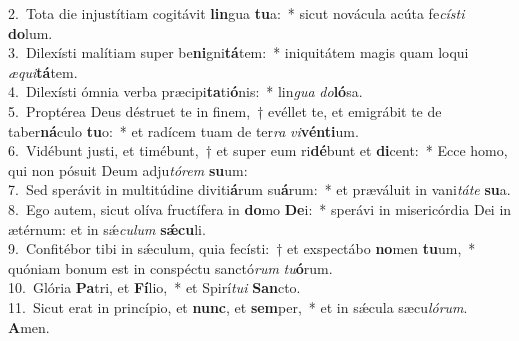 {2.~}Tota die injustítiam cogitávit \textbf{lin}gua \textbf{tu}a:~* sicut novácula acúta fe\textit{cí}\textit{sti} \textbf{do}lum.\\
{3.~}Dilexísti malítiam super be\textbf{ni}gni\textbf{tá}tem:~* iniquitátem magis quam loqui \textit{æ}\textit{qui}\textbf{tá}tem.\\
{4.~}Dilexísti ómnia verba præcipi\textbf{ta}ti\textbf{ó}nis:~* lin\textit{gua} \textit{do}\textbf{ló}sa.\\
{5.~}Proptérea Deus déstruet te in finem,~† evéllet te, et emigrábit te de taber\textbf{ná}culo \textbf{tu}o:~* et radícem tuam de ter\textit{ra} \textit{vi}\textbf{vén}\textbf{ti}um.\\
{6.~}Vidébunt justi, et timébunt,~† et super eum ri\textbf{dé}bunt et \textbf{di}cent:~* Ecce homo, qui non pósuit Deum adju\textit{tó}\textit{rem} \textbf{su}um:\\
{7.~}Sed sperávit in multitúdine diviti\textbf{á}rum su\textbf{á}rum:~* et præváluit in vani\textit{tá}\textit{te} \textbf{su}a.\\
{8.~}Ego autem, sicut olíva fructífera in \textbf{do}mo \textbf{De}i:~* sperávi in misericórdia Dei in ætérnum: et in sǽ\textit{cu}\textit{lum} \textbf{sǽ}\textbf{cu}li.\\
{9.~}Confitébor tibi in sǽculum, quia fecísti:~† et exspectábo \textbf{no}men \textbf{tu}um,~* quóniam bonum est in conspéctu sanctó\textit{rum} \textit{tu}\textbf{ó}rum.\\
{10.~}Glória \textbf{Pa}tri, et \textbf{Fí}lio,~* et Spirí\textit{tu}\textit{i} \textbf{San}cto.\\
{11.~}Sicut erat in princípio, et \textbf{nunc}, et \textbf{sem}per,~* et in sǽcula sæcu\textit{ló}\textit{rum}. \textbf{A}men.\\
